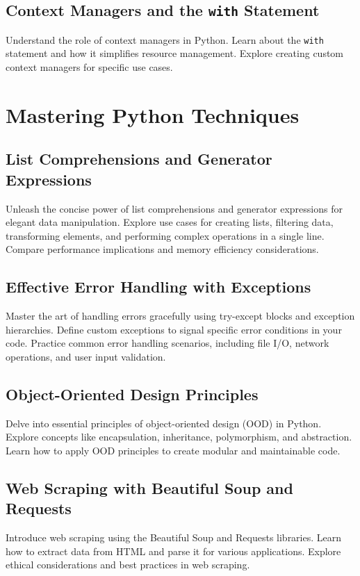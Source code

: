 \documentclass{article}
\begin{document}
\subsection{Context Managers and the \texttt{with} Statement}

Understand the role of context managers in Python.
Learn about the \texttt{with} statement and how it simplifies resource management.
Explore creating custom context managers for specific use cases.


\newpage
\thispagestyle{style}
\section{Mastering Python Techniques}

\subsection{List Comprehensions and Generator Expressions}

Unleash the concise power of list comprehensions and generator expressions for elegant data manipulation.
Explore use cases for creating lists, filtering data, transforming elements, and performing complex operations in a single line.
Compare performance implications and memory efficiency considerations.

\subsection{Effective Error Handling with Exceptions}

Master the art of handling errors gracefully using try-except blocks and exception hierarchies.
Define custom exceptions to signal specific error conditions in your code.
Practice common error handling scenarios, including file I/O, network operations, and user input validation.

\subsection{Object-Oriented Design Principles}

Delve into essential principles of object-oriented design (OOD) in Python.
Explore concepts like encapsulation, inheritance, polymorphism, and abstraction.
Learn how to apply OOD principles to create modular and maintainable code.

\subsection{Web Scraping with Beautiful Soup and Requests}

Introduce web scraping using the Beautiful Soup and Requests libraries.
Learn how to extract data from HTML and parse it for various applications.
Explore ethical considerations and best practices in web scraping.
\end{document}
